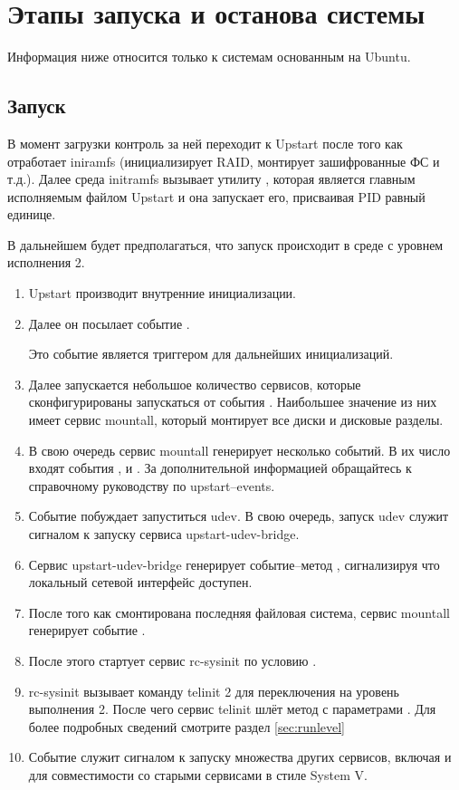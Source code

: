 \label{cpt:job_lifecycle}
\chapter{Этапы запуска и останова системы}
Информация ниже относится только к системам основанным на Ubuntu.
\section{Запуск}
В момент загрузки контроль за ней переходит к Upstart после того как отработает iniramfs (инициализирует 
RAID, монтирует зашифрованные ФС и т.д.). Далее среда initramfs вызывает утилиту , которая является главным исполняемым файлом Upstart и она запускает его, присваивая PID равный единице.

В дальнейшем будет предполагаться, что запуск происходит в среде с уровнем исполнения 2. \begin{enumerate}
\item Upstart производит внутренние инициализации.
\item Далее он посылает событие .

Это событие является триггером для дальнейших инициализаций.
\item Далее запускается небольшое количество сервисов, которые сконфигурированы запускаться от события . Наибольшее значение из них имеет сервис mountall, который монтирует все диски и дисковые разделы.
\item В свою очередь сервис mountall генерирует несколько событий. В их число входят события ,  и . За дополнительной информацией обращайтесь к справочному руководству по upstart--events.
\item Событие  побуждает запуститься udev. В свою очередь, запуск udev служит сигналом к запуску сервиса upstart-udev-bridge.
\item Сервис upstart-udev-bridge генерирует событие--метод , сигнализируя 
что локальный сетевой интерфейс доступен.
\item После того как смонтирована последняя файловая система, сервис mountall генерирует событие .
\item После этого стартует сервис rc-sysinit по условию .
\item rc-sysinit вызывает команду telinit 2 для переключения на уровень выполнения 2. После чего сервис telinit шлёт метод с параметрами . Для более подробных сведений смотрите раздел \ref{sec:runlevel}
\item Событие  служит сигналом к запуску множества других сервисов, включая и  для совместимости со старыми сервисами в стиле System V.
\end{enumerate}
